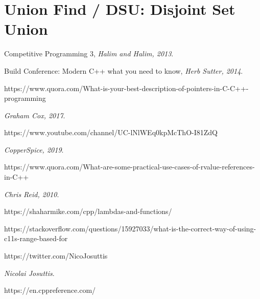 \documentclass[12pt, fleqn]{report}                             %
\theoremstyle{break}                                            %
\begin{document}
        \section{Union Find / DSU: Disjoint Set Union}




\begin{thebibliography}{10}

        Competitive Programming 3,
        \textit{Halim and Halim, 2013}. 


        Build Conference: Modern C++ what you need to know,
        \textit{Herb Sutter, 2014}. 

        https://www.quora.com/What-is-your-best-description-of-pointers-in-C-C++-programming

        \textit{Graham Cox, 2017}. 

        https://www.youtube.com/channel/UC-lNlWEq0kpMcThO-I81ZdQ

        \textit{CopperSpice, 2019}. 

        https://www.quora.com/What-are-some-practical-use-cases-of-rvalue-references-in-C++

        \textit{Chris Reid, 2010}. 

        https://shaharmike.com/cpp/lambdas-and-functions/

        https://stackoverflow.com/questions/15927033/what-is-the-correct-way-of-using-c11s-range-based-for

        https://twitter.com/NicoJosuttis
        
        \textit{Nicolai Josuttis}. 

        https://en.cppreference.com/


\end{thebibliography}
\end{document}
